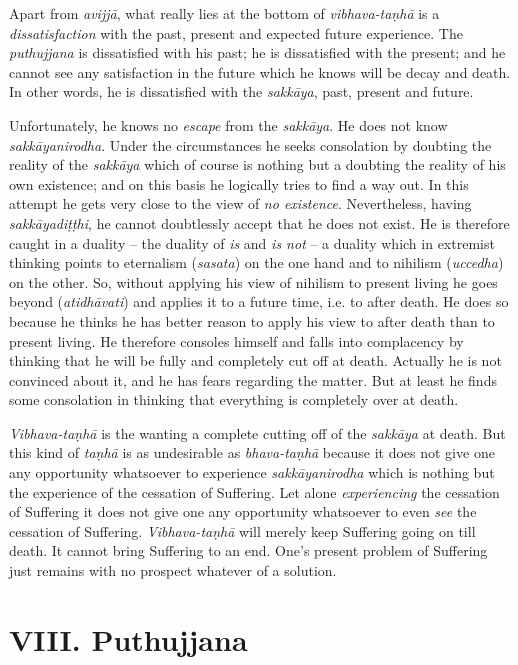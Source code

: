 \protect\hypertarget{vibhava-tanha}{}{}Apart from \textit{avijjā}, what really lies at the bottom of \textit{vibhava-taṇhā} is a \textit{dissatisfaction} with the past, present and expected future experience. The \textit{puthujjana} is dissatisfied with his past; he is dissatisfied with the present; and he cannot see any satisfaction in the future which he knows will be decay and death. In other words, he is dissatisfied with the \textit{sakkāya}, past, present and future.

Unfortunately, he knows no \emph{escape} from the \textit{sakkāya}. He does not know \textit{sakkāyanirodha}. Under the circumstances he seeks consolation by doubting the reality of the \textit{sakkāya} which of course is nothing but a doubting the reality of his own existence; and on this basis he logically tries to find a way out. In this attempt he gets very close to the view of \emph{no existence}. Nevertheless, having \textit{sakkāyadiṭṭhi}, he cannot doubtlessly accept that he does not exist. He is therefore caught in a duality -- the duality of \emph{is} and \emph{is not} -- a duality which in extremist thinking points to eternalism (\textit{sasata}) on the one hand and to nihilism (\textit{uccedha}) on the other. So, without applying his view of nihilism to present living he goes beyond (\textit{atidhāvati}) and applies it to a future time, i.e. to after death. He does so because he thinks he has better reason to apply his view to after death than to present living. He therefore consoles himself and falls into complacency by thinking that he will be fully and completely cut off at death. Actually he is not convinced about it, and he has fears regarding the matter. But at least he finds some consolation in thinking that everything is completely over at death.

\textit{Vibhava-taṇhā} is the wanting a complete cutting off of the \textit{sakkāya} at death. But this kind of \textit{taṇhā} is as undesirable as \textit{bhava-taṇhā} because it does not give one any opportunity whatsoever to experience \textit{sakkāyanirodha} which is nothing but the experience of the cessation of Suffering. Let alone \emph{experiencing} the cessation of Suffering it does not give one any opportunity whatsoever to even \emph{see} the cessation of Suffering. \textit{Vibhava-taṇhā} will merely keep Suffering going on till death. It cannot bring Suffering to an end. One's present problem of Suffering just remains with no prospect whatever of a solution.

\hypertarget{_viii_puthujjana}{%
\section{VIII. Puthujjana}\label{_viii_puthujjana}}

